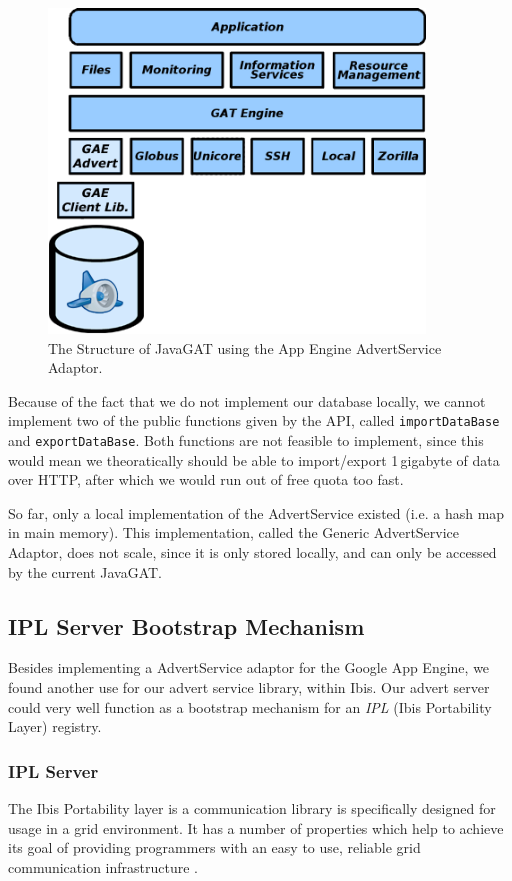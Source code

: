 \begin{figure}[ht] %
\begin{center}
\includegraphics[width=10cm]{./figures/gat-mydesign.png} 
\caption{The Structure of JavaGAT using the App
Engine AdvertService Adaptor.\label{applications-gaeasa}}
\end{center}
\end{figure}

Because of the fact that we do not implement our database locally, we cannot
implement two of the public functions given by the API, called
\texttt{importDataBase} and \texttt{exportDataBase}. Both functions are not
feasible to implement, since this would mean we theoratically should be able to
import/export 1\,gigabyte of data over HTTP, after which we would run out of
free quota too fast.

So far, only a local implementation of the AdvertService existed (i.e. a hash
map in main memory). This implementation, called the Generic AdvertService
Adaptor, does not scale, since it is only stored locally, and can only be
accessed by the current JavaGAT.

\subsection{IPL Server Bootstrap Mechanism}
\label{ipl}
Besides implementing a AdvertService adaptor for the Google App Engine, we
found another use for our advert service library, within Ibis. Our advert
server could very well function as a bootstrap mechanism for an \emph{IPL} (Ibis
Portability Layer) \cite{ipl-www} registry.

\subsubsection{IPL Server}
The Ibis Portability layer is a communication library is specifically
designed for usage in a grid environment. It has a number of properties which
help to achieve its goal of providing programmers with an easy to use, reliable
grid communication infrastructure \cite{ipl-www}.

